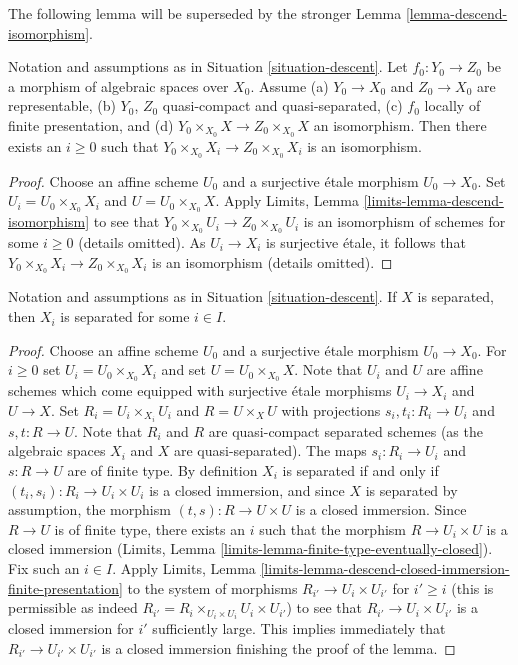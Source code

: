 \noindent
The following lemma will be superseded by the stronger
Lemma \ref{lemma-descend-isomorphism}.

\begin{lemma}
\label{lemma-descend-equality}
Notation and assumptions as in Situation \ref{situation-descent}.
Let $f_0 : Y_0 \to Z_0$ be a morphism of algebraic spaces over $X_0$.
Assume (a) $Y_0 \to X_0$ and $Z_0 \to X_0$ are representable, (b)
$Y_0$, $Z_0$ quasi-compact and quasi-separated, (c)
$f_0$ locally of finite presentation, and
(d) $Y_0 \times_{X_0} X \to Z_0 \times_{X_0} X$ an isomorphism.
Then there exists an $i \geq 0$ such that
$Y_0 \times_{X_0} X_i \to Z_0 \times_{X_0} X_i$ is an isomorphism.
\end{lemma}

\begin{proof}
Choose an affine scheme $U_0$ and a surjective \'etale morphism $U_0 \to X_0$.
Set $U_i = U_0 \times_{X_0} X_i$ and $U = U_0 \times_{X_0} X$.
Apply Limits, Lemma \ref{limits-lemma-descend-isomorphism}
to see that $Y_0 \times_{X_0} U_i \to Z_0 \times_{X_0} U_i$
is an isomorphism of schemes for some $i \geq 0$ (details omitted).
As $U_i \to X_i$ is surjective \'etale, it follows that
$Y_0 \times_{X_0} X_i \to Z_0 \times_{X_0} X_i$ is an isomorphism
(details omitted).
\end{proof}

\begin{lemma}
\label{lemma-descend-separated}
Notation and assumptions as in Situation \ref{situation-descent}.
If $X$ is separated, then $X_i$ is separated for some $i \in I$.
\end{lemma}

\begin{proof}
Choose an affine scheme $U_0$ and a surjective \'etale morphism $U_0 \to X_0$.
For $i \geq 0$ set $U_i = U_0 \times_{X_0} X_i$ and set
$U = U_0 \times_{X_0} X$. Note that $U_i$ and $U$ are affine schemes
which come equipped with surjective \'etale morphisms $U_i \to X_i$
and $U \to X$. Set $R_i = U_i \times_{X_i} U_i$ and $R = U \times_X U$
with projections $s_i, t_i : R_i \to U_i$ and $s, t : R \to U$.
Note that $R_i$ and $R$ are quasi-compact separated schemes (as the
algebraic spaces $X_i$ and $X$ are quasi-separated). The maps
$s_i : R_i \to U_i$ and $s : R \to U$ are of finite type.
By definition $X_i$ is separated if and only if
$(t_i, s_i) : R_i \to U_i \times U_i$
is a closed immersion, and since $X$ is separated by assumption,
the morphism $(t, s) : R \to U \times U$ is a closed immersion. Since
$R \to U$ is of finite type, there exists an
$i$ such that the morphism $R \to U_i \times U$ is a closed immersion
(Limits, Lemma \ref{limits-lemma-finite-type-eventually-closed}).
Fix such an $i \in I$. Apply Limits, Lemma
\ref{limits-lemma-descend-closed-immersion-finite-presentation}
to the system of morphisms $R_{i'} \to U_i \times U_{i'}$ for $i' \geq i$
(this is permissible as indeed
$R_{i'} = R_i \times_{U_i \times U_i} U_i \times U_{i'}$)
to see that $R_{i'} \to U_i \times U_{i'}$ is a closed immersion
for $i'$ sufficiently large. This implies immediately
that $R_{i'} \to U_{i'} \times U_{i'}$ is a closed immersion
finishing the proof of the lemma.
\end{proof}

